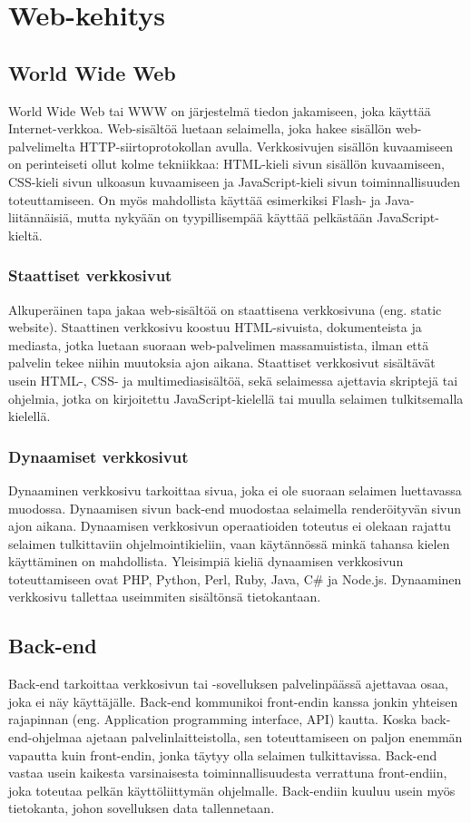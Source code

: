 \chapter{Web-kehitys}

\section{World Wide Web}
World Wide Web tai WWW on järjestelmä tiedon jakamiseen, joka käyttää Internet-verkkoa. Web-sisältöä luetaan selaimella,
joka hakee sisällön web-palvelimelta HTTP-siirtoprotokollan avulla. Verkkosivujen sisällön kuvaamiseen on perinteiseti
ollut kolme tekniikkaa: HTML-kieli sivun sisällön kuvaamiseen, CSS-kieli sivun ulkoasun kuvaamiseen ja JavaScript-kieli
sivun toiminnallisuuden toteuttamiseen. On myös mahdollista käyttää esimerkiksi Flash- ja Java-liitännäisiä, mutta
nykyään on tyypillisempää käyttää pelkästään JavaScript-kieltä. \cite{javascriptguide}

\subsection{Staattiset verkkosivut}
Alkuperäinen tapa jakaa web-sisältöä on staattisena verkkosivuna (eng. static website). Staattinen verkkosivu koostuu
HTML-sivuista, dokumenteista ja mediasta, jotka luetaan suoraan web-palvelimen massamuistista, ilman että palvelin tekee
niihin muutoksia ajon aikana. Staattiset verkkosivut sisältävät usein HTML-, CSS- ja multimediasisältöä, sekä selaimessa
ajettavia skriptejä tai ohjelmia, jotka on kirjoitettu JavaScript-kielellä tai muulla selaimen tulkitsemalla kielellä.
\cite{staticdynamicwebsites}

\subsection{Dynaamiset verkkosivut}
Dynaaminen verkkosivu tarkoittaa sivua, joka ei ole suoraan selaimen luettavassa muodossa. Dynaamisen sivun back-end
muodostaa selaimella renderöityvän sivun ajon aikana. Dynaamisen verkkosivun operaatioiden toteutus ei olekaan rajattu
selaimen tulkittaviin ohjelmointikieliin, vaan käytännössä minkä tahansa kielen käyttäminen on mahdollista. Yleisimpiä
kieliä dynaamisen verkkosivun toteuttamiseen ovat PHP, Python, Perl, Ruby, Java, C\# ja Node.js. Dynaaminen verkkosivu
tallettaa useimmiten sisältönsä tietokantaan. \cite{staticdynamicwebsites}

\section{Back-end}
Back-end tarkoittaa verkkosivun tai -sovelluksen palvelinpäässä ajettavaa osaa, joka ei näy käyttäjälle. Back-end
kommunikoi front-endin kanssa jonkin yhteisen rajapinnan (eng. Application programming interface, API) kautta. Koska
back-end-ohjelmaa ajetaan palvelinlaitteistolla, sen toteuttamiseen on paljon enemmän vapautta kuin front-endin, jonka
täytyy olla selaimen tulkittavissa. Back-end vastaa usein kaikesta varsinaisesta toiminnallisuudesta verrattuna
front-endiin, joka toteutaa pelkän käyttöliittymän ohjelmalle. Back-endiin kuuluu usein myös tietokanta, johon
sovelluksen data tallennetaan. \cite{fullstackdeveloper}

